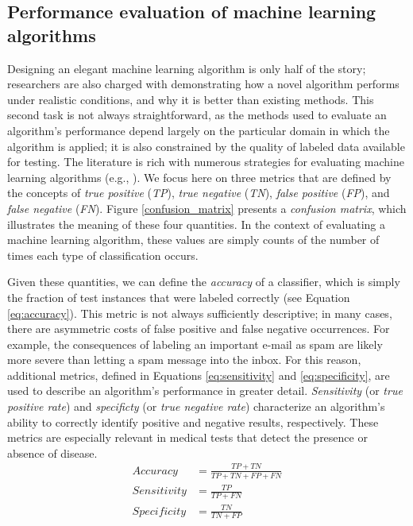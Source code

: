 \documentclass[12pt]{article} %
\begin{document}
\subsection{Performance evaluation of machine learning algorithms}
Designing an elegant machine learning algorithm is only half of the story; researchers are also charged with demonstrating how a novel algorithm performs under realistic conditions, and why it is better than existing methods.
This second task is not always straightforward, as the methods used to evaluate an algorithm's performance depend largely on the particular domain in which the algorithm is applied; it is also constrained by the quality of labeled data available for testing.
The literature is rich with numerous strategies for evaluating machine learning algorithms (e.g., \cite{bradley1997}).
We focus here on three metrics that are defined by the concepts of \textit{true positive} (\textit{TP}), \textit{true negative} (\textit{TN}), \textit{false positive} (\textit{FP}), and \textit{false negative} (\textit{FN}). Figure \ref{confusion_matrix} presents a \textit{confusion matrix}, which illustrates the meaning of these four quantities. In the context of evaluating a machine learning algorithm, these values are simply counts of the number of times each type of classification occurs.



Given these quantities, we can define the \textit{accuracy} of a classifier, which is simply the fraction of test instances that were labeled correctly (see Equation \ref{eq:accuracy}).
This metric is not always sufficiently descriptive; in many cases, there are asymmetric costs of false positive and false negative occurrences.
For example, the consequences of labeling an important e-mail as spam are likely more severe than letting a spam message into the inbox.
For this reason, additional metrics, defined in Equations \ref{eq:sensitivity} and \ref{eq:specificity}, are used to describe an algorithm's performance in greater detail. \textit{Sensitivity} (or \textit{true positive rate}) and \textit{specificty} (or \textit{true negative rate}) characterize an algorithm's ability to correctly identify positive and negative results, respectively. These metrics are especially relevant in medical tests that detect the presence or absence of disease.
\begin{align}
Accuracy &= \frac{TP + TN}{TP+TN+FP+FN}\label{eq:accuracy}\\[1.5ex]
Sensitivity &= \frac{TP}{TP +FN}\label{eq:sensitivity}\\[1.5ex]
Specificity &= \frac{TN}{TN+FP}\label{eq:specificity}
\end{align}
\end{document}
